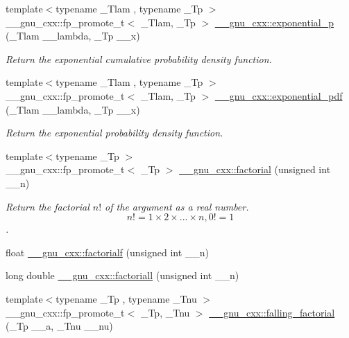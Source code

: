 \begin{DoxyCompactItemize}
\item 
{\footnotesize template$<$typename \+\_\+\+Tlam , typename \+\_\+\+Tp $>$ }\\\+\_\+\+\_\+gnu\+\_\+cxx\+::fp\+\_\+promote\+\_\+t$<$ \+\_\+\+Tlam, \+\_\+\+Tp $>$ \hyperlink{group__gnu__math__spec__func_gaa546f47f8ab943d2c10b56bec8a44079}{\+\_\+\+\_\+gnu\+\_\+cxx\+::exponential\+\_\+p} (\+\_\+\+Tlam \+\_\+\+\_\+lambda, \+\_\+\+Tp \+\_\+\+\_\+x)
\begin{DoxyCompactList}\small\item\em Return the exponential cumulative probability density function. \end{DoxyCompactList}\item 
{\footnotesize template$<$typename \+\_\+\+Tlam , typename \+\_\+\+Tp $>$ }\\\+\_\+\+\_\+gnu\+\_\+cxx\+::fp\+\_\+promote\+\_\+t$<$ \+\_\+\+Tlam, \+\_\+\+Tp $>$ \hyperlink{group__gnu__math__spec__func_ga7f35499a94fd8930810809988332161e}{\+\_\+\+\_\+gnu\+\_\+cxx\+::exponential\+\_\+pdf} (\+\_\+\+Tlam \+\_\+\+\_\+lambda, \+\_\+\+Tp \+\_\+\+\_\+x)
\begin{DoxyCompactList}\small\item\em Return the exponential probability density function. \end{DoxyCompactList}\item 
{\footnotesize template$<$typename \+\_\+\+Tp $>$ }\\\+\_\+\+\_\+gnu\+\_\+cxx\+::fp\+\_\+promote\+\_\+t$<$ \+\_\+\+Tp $>$ \hyperlink{group__gnu__math__spec__func_ga963b1612f50b0964f5f42c9f289aab68}{\+\_\+\+\_\+gnu\+\_\+cxx\+::factorial} (unsigned int \+\_\+\+\_\+n)
\begin{DoxyCompactList}\small\item\em Return the factorial $ n! $ of the argument as a real number. \[ n! = 1 \times 2 \times ... \times n, 0! = 1 \]. \end{DoxyCompactList}\item 
float \hyperlink{group__gnu__math__spec__func_ga5a288283a8ed63e1d2b0145f313a5378}{\+\_\+\+\_\+gnu\+\_\+cxx\+::factorialf} (unsigned int \+\_\+\+\_\+n)
\item 
long double \hyperlink{group__gnu__math__spec__func_ga0904e504fdc3c8b9b6f5c66a73531584}{\+\_\+\+\_\+gnu\+\_\+cxx\+::factoriall} (unsigned int \+\_\+\+\_\+n)
\item 
{\footnotesize template$<$typename \+\_\+\+Tp , typename \+\_\+\+Tnu $>$ }\\\+\_\+\+\_\+gnu\+\_\+cxx\+::fp\+\_\+promote\+\_\+t$<$ \+\_\+\+Tp, \+\_\+\+Tnu $>$ \hyperlink{group__gnu__math__spec__func_ga3cc8eb6068c7155ec48b40e20160c5c0}{\+\_\+\+\_\+gnu\+\_\+cxx\+::falling\+\_\+factorial} (\+\_\+\+Tp \+\_\+\+\_\+a, \+\_\+\+Tnu \+\_\+\+\_\+nu)

\end{DoxyCompactItemize}
